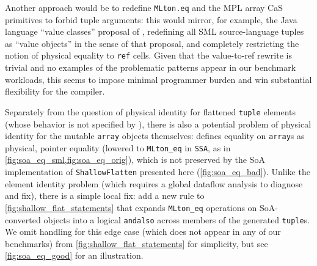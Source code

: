 Another approach would be to redefine \texttt{MLton.eq} and the MPL array CaS
primitives to forbid tuple arguments: this would mirror, for example, the Java
language ``value classes'' proposal of \citet{jep401-valhalla}, redefining all
SML source-language tuples as ``value objects'' in the sense of that proposal,
and completely restricting the notion of physical equality to \texttt{ref}
cells. Given that the value-to-ref rewrite is trivial and no examples of the
problematic patterns appear in our benchmark workloads, this seems to impose
minimal programmer burden and win substantial flexibility for the compiler.

Separately from the question of physical identity for flattened \texttt{tuple}
elements (whose behavior is not specified by \citet{sml-def}), there is also a
potential problem of physical identity for the mutable \texttt{array} objects
themselves: \citet{sml-def} defines equality on \texttt{array}s as physical,
pointer equality (lowered to \texttt{MLton\_eq} in \texttt{SSA}, as in
\cref{fig:soa_eq_sml,fig:soa_eq_orig}), which is not preserved by the SoA
implementation of \texttt{ShallowFlatten} presented here
(\cref{fig:soa_eq_bad}). Unlike the element identity problem (which requires a
global dataflow analysis to diagnose and fix), there is a simple local fix: add
a new rule to \cref{fig:shallow_flat_statements} that expands \texttt{MLton\_eq}
operations on SoA-converted objects into a logical \texttt{andalso} across
members of the generated \texttt{tuple}s. We omit handling for this edge case
(which does not appear in any of our benchmarks) from
\cref{fig:shallow_flat_statements} for simplicity, but see
\cref{fig:soa_eq_good} for an illustration.

